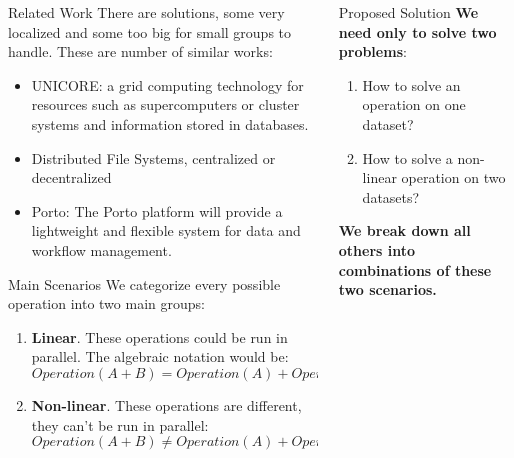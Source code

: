 \documentclass[final,hyperref={pdfpagelabels=true}]{beamer}
\begin{document}
\begin{frame}
\begin{columns}[t]
\begin{column}{.45\textwidth}
      \begin{block}{Related Work}
        There are solutions, some very localized and some too big for small groups to handle. These are number of similar works:
        \begin{itemize}
        \item UNICORE: a grid computing technology for resources such as supercomputers or cluster systems and information stored in databases.\cite{unicore}
        \item Distributed File Systems, centralized or decentralized
        \item Porto: The Porto platform will provide a lightweight and flexible system for data and workflow management.\cite{porto}
        \end{itemize}
      \end{block}


      \begin{block}{Main Scenarios}
      We categorize every possible operation into two main groups:
      \begin{enumerate}
      \item \textbf{Linear}. These operations could be run in parallel. The algebraic notation would be:
      \[ Operation(A + B) = Operation(A) + Operation(B) \]
      \item \textbf{Non-linear}. These operations are different, they can't be run in parallel:
      \[ Operation(A + B) \neq Operation(A) + Operation(B) \]
      \end{enumerate}
      \end{block}

    \end{column}

    \begin{column}{.45\textwidth}

      \begin{block}{Proposed Solution}
      \textbf{We need only to solve two problems}:
      \begin{enumerate}
      \item How to solve an operation on one dataset?
      \item How to solve a non-linear operation on two datasets?
      \end{enumerate}
      \textbf{We break down all others into combinations of these two scenarios.}
      

\end{block}
\end{column}
\end{columns}
\end{frame}
\end{document}
